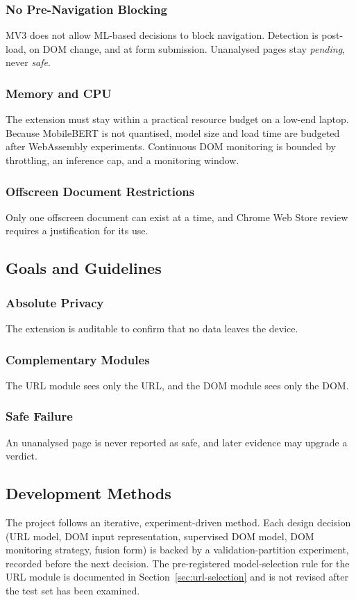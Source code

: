 \documentclass{FastFyp}
\begin{document}
\subsubsection{No Pre-Navigation Blocking}
MV3 does not allow ML-based decisions to block navigation. Detection is post-load, on DOM change, and at form submission. Unanalysed pages stay \emph{pending}, never \emph{safe}.

\subsubsection{Memory and CPU}
The extension must stay within a practical resource budget on a low-end laptop. Because MobileBERT is not quantised, model size and load time are budgeted after WebAssembly experiments. Continuous DOM monitoring is bounded by throttling, an inference cap, and a monitoring window.

\subsubsection{Offscreen Document Restrictions}
Only one offscreen document can exist at a time, and Chrome Web Store review requires a justification for its use.

\subsection{Goals and Guidelines}


\subsubsection{Absolute Privacy}
The extension is auditable to confirm that no data leaves the device.

\subsubsection{Complementary Modules}
The URL module sees only the URL, and the DOM module sees only the DOM.

\subsubsection{Safe Failure}
An unanalysed page is never reported as safe, and later evidence may upgrade a verdict.

\subsection{Development Methods}
The project follows an iterative, experiment-driven method. Each design decision (URL model, DOM input representation, supervised DOM model, DOM monitoring strategy, fusion form) is backed by a validation-partition experiment, recorded before the next decision. The pre-registered model-selection rule for the URL module is documented in Section~\ref{sec:url-selection} and is not revised after the test set has been examined.
\end{document}
